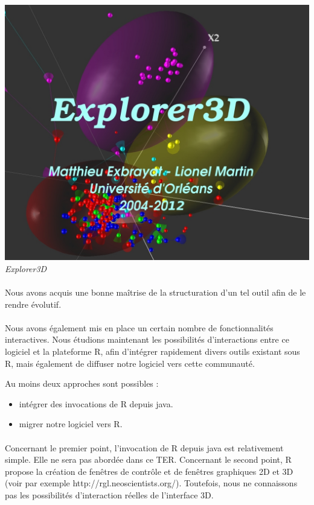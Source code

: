 \begin{center}
\includegraphics[scale=0.3]{explorer3d.jpg}\\
\textit{Explorer3D}
\end{center}

\paragraph{}
Nous avons acquis une bonne maîtrise de la structuration d'un tel outil afin de le rendre évolutif.
\newpage
\paragraph{}
Nous avons également mis en place un certain nombre de fonctionnalités interactives.
Nous étudions maintenant les possibilités d'interactions entre ce logiciel et la plateforme R, afin d'intégrer rapidement divers outils existant sous R, mais également de diffuser notre logiciel vers cette communauté.


Au moins deux approches sont possibles :
\begin{itemize}

\item intégrer des invocations de R depuis java.
\item migrer notre logiciel vers R.
\end{itemize}

\paragraph{}
Concernant le premier point, l'invocation de R depuis java est relativement simple. Elle ne sera pas
abordée dans ce TER. Concernant le second point, R propose la création de fenêtres de contrôle et
de fenêtres graphiques 2D et 3D (voir par exemple http://rgl.neoscientists.org/). Toutefois, nous ne
connaissons pas les possibilités d'interaction réelles de l'interface 3D.

